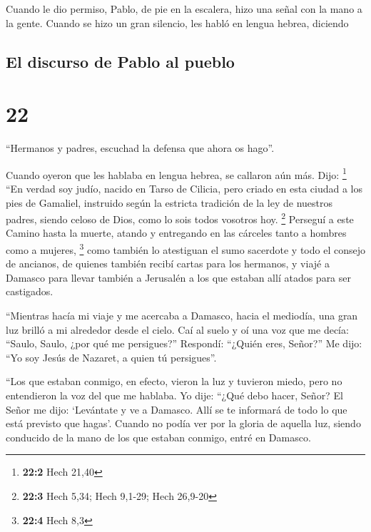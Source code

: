  Cuando le dio permiso, Pablo, de pie en la escalera,
hizo una señal con la mano a la gente. Cuando se hizo un gran silencio,
les habló en lengua hebrea, diciendo

\hypertarget{el-discurso-de-pablo-al-pueblo}{%
\subsection{El discurso de Pablo al
pueblo}\label{el-discurso-de-pablo-al-pueblo}}

\hypertarget{section-21}{%
\section{22}\label{section-21}}

 ``Hermanos y padres, escuchad la defensa que ahora os
hago''.

 Cuando oyeron que les hablaba en lengua hebrea, se
callaron aún más. Dijo: \footnote{\textbf{22:2} Hech 21,40}
 ``En verdad soy judío, nacido en Tarso de Cilicia, pero
criado en esta ciudad a los pies de Gamaliel, instruido según la
estricta tradición de la ley de nuestros padres, siendo celoso de Dios,
como lo sois todos vosotros hoy. \footnote{\textbf{22:3} Hech 5,34; Hech
  9,1-29; Hech 26,9-20}  Perseguí a este Camino hasta la
muerte, atando y entregando en las cárceles tanto a hombres como a
mujeres, \footnote{\textbf{22:4} Hech 8,3}  como también
lo atestiguan el sumo sacerdote y todo el consejo de ancianos, de
quienes también recibí cartas para los hermanos, y viajé a Damasco para
llevar también a Jerusalén a los que estaban allí atados para ser
castigados.

 ``Mientras hacía mi viaje y me acercaba a Damasco, hacia
el mediodía, una gran luz brilló a mi alrededor desde el cielo.
 Caí al suelo y oí una voz que me decía: ``Saulo, Saulo,
¿por qué me persigues?''  Respondí: ``¿Quién eres,
Señor?'' Me dijo: ``Yo soy Jesús de Nazaret, a quien tú persigues''.

 ``Los que estaban conmigo, en efecto, vieron la luz y
tuvieron miedo, pero no entendieron la voz del que me hablaba.
 Yo dije: ``¿Qué debo hacer, Señor? El Señor me dijo:
`Levántate y ve a Damasco. Allí se te informará de todo lo que está
previsto que hagas'.  Cuando no podía ver por la gloria
de aquella luz, siendo conducido de la mano de los que estaban conmigo,
entré en Damasco.

